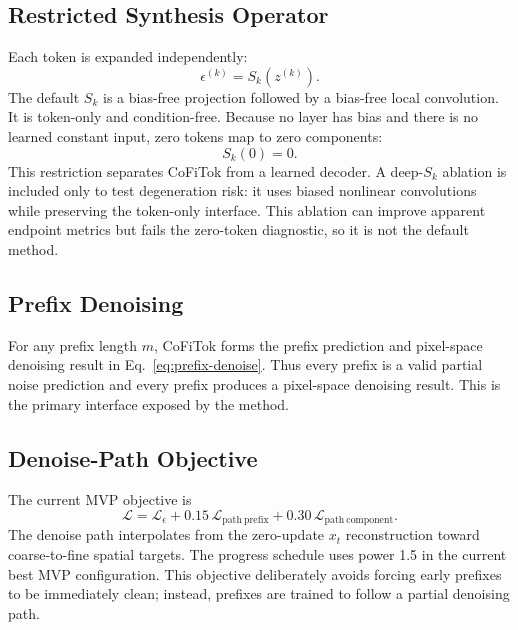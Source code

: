 \documentclass[11pt]{article}
\newcommand{\method}{CoFiTok}
\begin{document}
\subsection{Restricted Synthesis Operator}

Each token is expanded independently:
\begin{equation}
  \epsilon^{(k)} = S_k\left(z^{(k)}\right).
\end{equation}
The default $S_k$ is a bias-free projection followed by a bias-free local
convolution. It is token-only and condition-free. Because no layer has bias and
there is no learned constant input, zero tokens map to zero components:
\begin{equation}
  S_k(0)=0.
\end{equation}
This restriction separates \method{} from a learned decoder. A deep-$S_k$
ablation is included only to test degeneration risk: it uses biased nonlinear
convolutions while preserving the token-only interface. This ablation can
improve apparent endpoint metrics but fails the zero-token diagnostic, so it is
not the default method.

\subsection{Prefix Denoising}

For any prefix length $m$, \method{} forms the prefix prediction and pixel-space
denoising result in Eq.~\ref{eq:prefix-denoise}. Thus every prefix is a valid
partial noise prediction and every prefix produces a pixel-space denoising
result. This is the primary interface exposed by the method.

\subsection{Denoise-Path Objective}

The current MVP objective is
\begin{equation}
  \mathcal{L}
  =
  \mathcal{L}_{\epsilon}
  + 0.15\,\mathcal{L}_{\mathrm{path\ prefix}}
  + 0.30\,\mathcal{L}_{\mathrm{path\ component}}.
\end{equation}
The denoise path interpolates from the zero-update $x_t$ reconstruction toward
coarse-to-fine spatial targets. The progress schedule uses power 1.5 in the
current best MVP configuration. This objective deliberately avoids forcing early
prefixes to be immediately clean; instead, prefixes are trained to follow a
partial denoising path.
\end{document}
